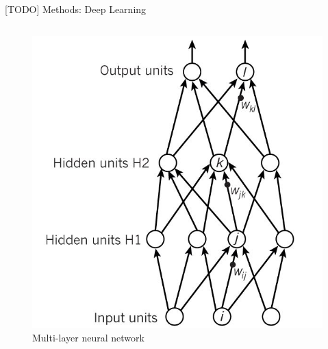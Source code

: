 \documentclass[final,hyperref={pdfpagelabels=false}]{beamer}
\begin{document}
\begin{frame}[t]
\begin{columns}[t]
\begin{column}{.465\textwidth}
\begin{block}{[TODO] Methods: Deep Learning}
\begin{columns}
\begin{column}{.4\textwidth}
\begin{figure}
\includegraphics[width=.9\linewidth]{nature-deep-learning/fig_1c}
\caption{Multi-layer neural network \cite{lecun2015deep}}
\end{figure}
\end{column}
\end{columns} %


\end{block}
\end{column}
\end{columns}
\end{frame}
\end{document}
